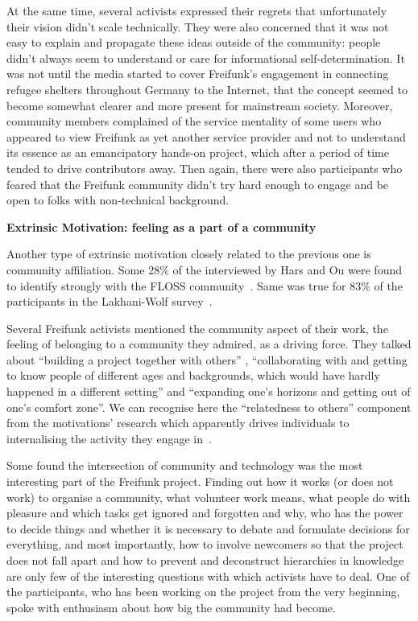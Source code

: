 \documentclass{scrartcl}
\begin{document}
At the same time, several activists expressed their regrets that unfortunately their vision didn't scale technically.
They were also concerned that it was not easy to explain and propagate these ideas outside of the community: people didn't always seem to understand or care for informational self-determination.
It was not until the media started to cover Freifunk's engagement in connecting refugee shelters throughout Germany to the Internet, that the concept seemed to become somewhat clearer and more present for mainstream society.
Moreover, community members complained of the service mentality of some users who appeared to view Freifunk as yet another service provider and not to understand its essence as an emancipatory hands-on project, which after a period of time tended to drive contributors away.
Then again, there were also participants who feared that the Freifunk community didn't try hard enough to engage and be open to folks with non-technical background.

\textbf{Extrinsic Motivation: feeling as a part of a community}

Another type of extrinsic motivation closely related to the previous one is community affiliation.
Some $28\%$ of the interviewed by Hars and Ou were found to identify strongly with the FLOSS community~\cite{HarOu2002}.
Same was true for $83\%$ of the participants in the Lakhani-Wolf survey~\cite{LakWo2005}.

Several Freifunk activists mentioned the community aspect of their work, the feeling of belonging to a community they admired, as a driving force.
They talked about ``building a project together with others''
, ``collaborating with and getting to know people of different ages and backgrounds, which would have hardly happened in a different setting'' and ``expanding one's horizons and getting out of one's comfort zone''.
We can recognise here the ``relatedness to others'' component from the motivations' research which apparently drives individuals to internalising the activity they engage in~\cite{RyDe2000}.

Some found the intersection of community and technology was the most interesting part of the Freifunk project.
Finding out how it works (or does not work) to organise a community, what volunteer work means, what people do with pleasure and which tasks get ignored and forgotten and why, who has the power to decide things and whether it is necessary to debate and formulate decisions for everything, and most importantly, how to involve newcomers so that the project does not fall apart and how to prevent and deconstruct hierarchies in knowledge are only few of the interesting questions with which activists have to deal.
One of the participants, who has been working on the project from the very beginning, spoke with enthusiasm about how big the community had become.
\end{document}
